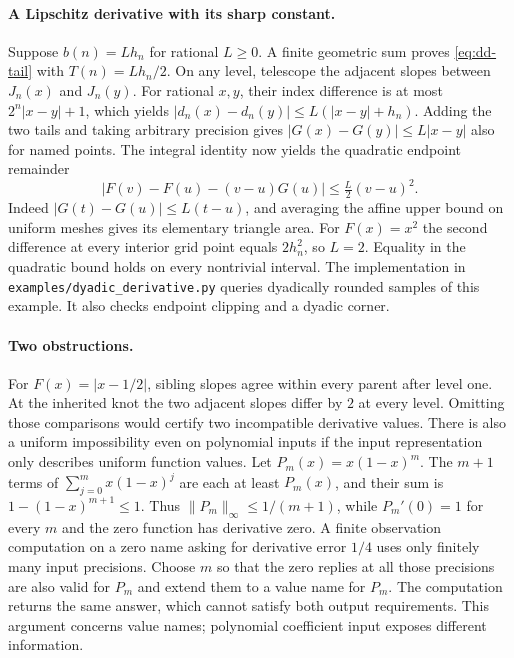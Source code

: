 \paragraph{A Lipschitz derivative with its sharp constant.}
Suppose $b(n)=Lh_n$ for rational $L\ge0$. A finite geometric sum proves \eqref{eq:dd-tail} with $T(n)=Lh_n/2$. On any level, telescope the adjacent slopes between $J_n(x)$ and $J_n(y)$. For rational $x,y$, their index difference is at most $2^n|x-y|+1$, which yields
$|d_n(x)-d_n(y)|\le L(|x-y|+h_n)$. Adding the two tails and taking arbitrary precision gives $|G(x)-G(y)|\le L|x-y|$ also for named points. The integral identity now yields the quadratic endpoint remainder
\[
 |F(v)-F(u)-(v-u)G(u)|\le \tfrac{L}{2}(v-u)^2 .
\]
Indeed $|G(t)-G(u)|\le L(t-u)$, and averaging the affine upper bound on uniform meshes gives its elementary triangle area. For $F(x)=x^2$ the second difference at every interior grid point equals $2h_n^2$, so $L=2$. Equality in the quadratic bound holds on every nontrivial interval. The implementation in \texttt{examples/dyadic\_derivative.py} queries dyadically rounded samples of this example. It also checks endpoint clipping and a dyadic corner.

\paragraph{Two obstructions.}
For $F(x)=|x-1/2|$, sibling slopes agree within every parent after level one. At the inherited knot the two adjacent slopes differ by $2$ at every level. Omitting those comparisons would certify two incompatible derivative values. There is also a uniform impossibility even on polynomial inputs if the input representation only describes uniform function values. Let $P_m(x)=x(1-x)^m$. The $m+1$ terms of $\sum_{j=0}^m x(1-x)^j$ are each at least $P_m(x)$, and their sum is $1-(1-x)^{m+1}\le1$. Thus $\|P_m\|_\infty\le1/(m+1)$, while $P_m'(0)=1$ for every $m$ and the zero function has derivative zero. A finite observation computation on a zero name asking for derivative error $1/4$ uses only finitely many input precisions. Choose $m$ so that the zero replies at all those precisions are also valid for $P_m$ and extend them to a value name for $P_m$. The computation returns the same answer, which cannot satisfy both output requirements. This argument concerns value names; polynomial coefficient input exposes different information.

